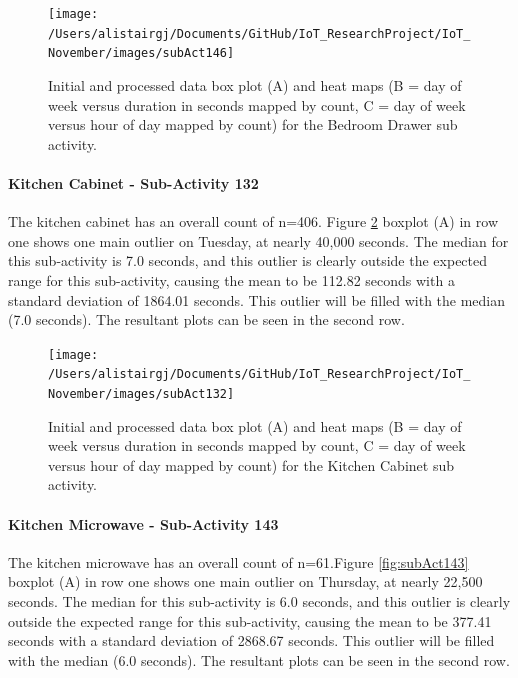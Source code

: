 \documentclass[11pt,]{article}
\let\oldparagraph\paragraph
\renewcommand{\paragraph}[1]{\oldparagraph{#1}\mbox{}}
\begin{document}
\begin{figure}[H]

{\centering \texttt{[image: /Users/alistairgj/Documents/GitHub/IoT\_ResearchProject/IoT\_November/images/subAct146]} 

}

\caption{Initial and processed data box plot (A) and heat maps (B = day of week versus duration in seconds mapped by count, C = day of week versus hour of day mapped by count) for the Bedroom Drawer sub activity.}\label{fig:subAct146}
\end{figure}

\hypertarget{kitchen-cabinet---sub-activity-132}{%
\paragraph{Kitchen Cabinet - Sub-Activity
132}\label{kitchen-cabinet---sub-activity-132}}

The kitchen cabinet has an overall count of n=406. Figure
\ref{fig:subAct132} boxplot (A) in row one shows one main outlier on
Tuesday, at nearly 40,000 seconds. The median for this sub-activity is
7.0 seconds, and this outlier is clearly outside the expected range for
this sub-activity, causing the mean to be 112.82 seconds with a standard
deviation of 1864.01 seconds. This outlier will be filled with the
median (7.0 seconds). The resultant plots can be seen in the second row.

\begin{figure}[H]

{\centering \texttt{[image: /Users/alistairgj/Documents/GitHub/IoT\_ResearchProject/IoT\_November/images/subAct132]} 

}

\caption{Initial and processed data box plot (A) and heat maps (B = day of week versus duration in seconds mapped by count, C = day of week versus hour of day mapped by count) for the Kitchen Cabinet sub activity.}\label{fig:subAct132}
\end{figure}

\hypertarget{kitchen-microwave---sub-activity-143}{%
\paragraph{Kitchen Microwave - Sub-Activity
143}\label{kitchen-microwave---sub-activity-143}}

The kitchen microwave has an overall count of n=61.Figure
\ref{fig:subAct143} boxplot (A) in row one shows one main outlier on
Thursday, at nearly 22,500 seconds. The median for this sub-activity is
6.0 seconds, and this outlier is clearly outside the expected range for
this sub-activity, causing the mean to be 377.41 seconds with a standard
deviation of 2868.67 seconds. This outlier will be filled with the
median (6.0 seconds). The resultant plots can be seen in the second row.
\end{document}
